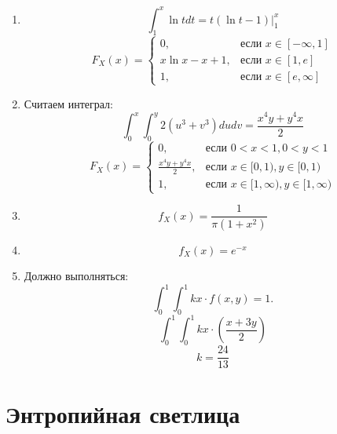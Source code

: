 \documentclass[a4paper,12pt]{article}
\begin{document}
\begin{enumerate}
\item %
\[
\int_1^x \ln{t} dt = \left. t(\ln{t} - 1) \right|_1^x
\]
\[
F_X(x) =
\begin{cases}
0, &\text{если } x\in[-\infty, 1] \\
x\ln{x} - x + 1,&\text{если } x\in[1, e] \\
1,&\text{если } x\in[e, \infty]
\end{cases}
\]
\item
Считаем интеграл:
\[
\int_0^x\int_0^y 2(u^3 + v^3)du dv = \frac{x^4y+y^4x}{2}
\]
\[
F_X(x) =
\begin{cases}
0, &\text{если } 0 < x < 1, 0 < y < 1\\
\frac{x^4y+y^4x}{2}, &\text{если } x\in[0, 1), y\in[0, 1)\\
1, &\text{если } x\in[1, \infty), y\in[1, \infty)
\end{cases}
\]
\item %
\[
f_X(x) = \frac{1}{\pi(1 + x^2)}
\]
\item %
\[
f_X(x) = e^{-x}
\]
\item %
Должно выполняться:
\[
\int_0^1\int_0^1 kx\cdot f(x, y) = 1.
\]
\[
\int_0^1\int_0^1 kx\cdot \left(\frac{x + 3y}{2}\right)
\]
\[
k = \frac{24}{13}
\]
\end{enumerate}





\newpage
\section{Энтропийная светлица} %
\end{document}
